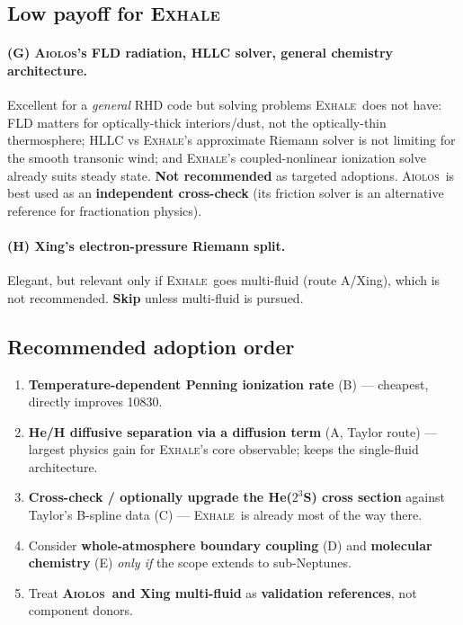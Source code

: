 \documentclass[11pt]{article}
\newcommand{\EXHALE}{\textsc{Exhale}}
\newcommand{\AIOLOS}{\textsc{Aiolos}}
\begin{document}
\subsection{Low payoff for \EXHALE}

\paragraph{(G) \AIOLOS's FLD radiation, HLLC solver, general chemistry architecture.}
Excellent for a \emph{general} RHD code but solving problems \EXHALE\ does not have: FLD
matters for optically-thick interiors/dust, not the optically-thin thermosphere; HLLC vs
\EXHALE's approximate Riemann solver is not limiting for the smooth transonic wind; and
\EXHALE's coupled-nonlinear ionization solve already suits steady state. \textbf{Not
recommended} as targeted adoptions. \AIOLOS\ is best used as an \textbf{independent
cross-check} (its friction solver is an alternative reference for fractionation physics).

\paragraph{(H) Xing's electron-pressure Riemann split.}
Elegant, but relevant only if \EXHALE\ goes multi-fluid (route A/Xing), which is not
recommended. \textbf{Skip} unless multi-fluid is pursued.

\subsection{Recommended adoption order}
\begin{enumerate}[nosep]
  \item \textbf{Temperature-dependent Penning ionization rate} (B) --- cheapest, directly
    improves 10830.
  \item \textbf{He/H diffusive separation via a diffusion term} (A, Taylor route) --- largest
    physics gain for \EXHALE's core observable; keeps the single-fluid architecture.
  \item \textbf{Cross-check / optionally upgrade the He($2^3$S) cross section} against
    Taylor's B-spline data (C) --- \EXHALE\ is already most of the way there.
  \item Consider \textbf{whole-atmosphere boundary coupling} (D) and \textbf{molecular
    chemistry} (E) \emph{only if} the scope extends to sub-Neptunes.
  \item Treat \textbf{\AIOLOS\ and Xing multi-fluid} as \textbf{validation references}, not
    component donors.
\end{enumerate}
\end{document}
